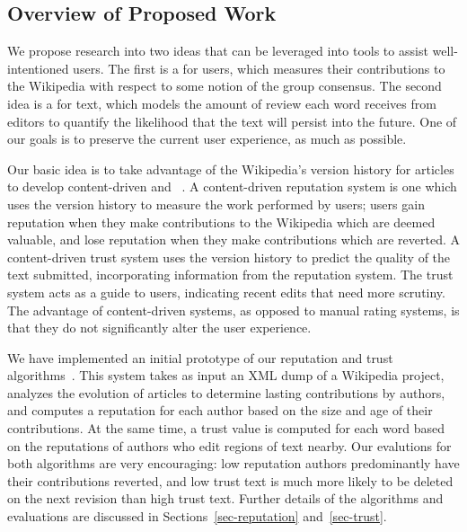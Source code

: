 \subsection{Overview of Proposed Work}

We propose research into two ideas that can be leveraged
into tools to assist well-intentioned users.
The first is a  for users, which measures
their contributions to the Wikipedia with respect to some
notion of the group consensus.
The second idea is a  for text,
which models the amount of review each word receives from editors
to quantify the likelihood that the text will persist
into the future.
One of our goals is to preserve the current user experience,
as much as possible.


Our basic idea is to take advantage of the Wikipedia's version history
for articles to develop content-driven 
and ~\cite{WikiMTWtrust06,McGuinness06,www07,WikiTrust2008}.
A content-driven reputation system is one which uses
the version history to measure the work performed by users;
users gain reputation when they make
contributions to the Wikipedia which are deemed valuable, and lose reputation
when they make contributions which are reverted.
A content-driven trust system uses the version history
to predict the quality of the text submitted, incorporating
information from the reputation system.
The trust system acts as a guide to users,
indicating recent edits that need more scrutiny.
The advantage of content-driven systems,
as opposed to manual rating systems, is that they do
not significantly alter the user experience.

We have implemented an initial prototype of our reputation and
trust algorithms~\cite{www07,WikiTrust2008}.
This system takes as input an XML dump of a Wikipedia project,
analyzes the evolution of articles to determine lasting
contributions by authors, and computes a reputation for
each author based on the size and age of their contributions.
At the same time, a trust value is computed for each word
based on the reputations of authors who edit
regions of text nearby.
Our evalutions for both algorithms are very encouraging:
low reputation authors predominantly have their contributions
reverted, and low trust text is much more likely to be
deleted on the next revision than high trust text.
Further details of the algorithms and evaluations
are discussed in Sections~\ref{sec-reputation}
and~\ref{sec-trust}.

